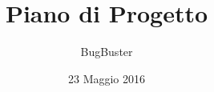 




\title{\textbf{Piano di Progetto}}
\author{BugBuster}

\date{23 Maggio 2016}




\makeFrontPage

\tableofcontents
\listoffigures
\listoftables





